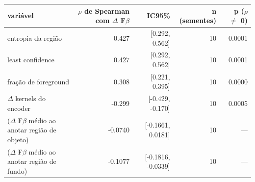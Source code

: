\begin{tabular}{lrrrr}
\toprule
variável & $\rho$ de Spearman com $\Delta$ F$\beta$ & IC95\% & n (sementes) & p ($\rho$ $\neq$ 0) \\
\midrule
entropia da região & 0.427 & [0.292, 0.562] & 10 & 0.0001 \\
least confidence & 0.427 & [0.292, 0.562] & 10 & 0.0001 \\
fração de foreground & 0.308 & [0.221, 0.395] & 10 & 0.0000 \\
$\Delta$ kernels do encoder & -0.299 & [-0.429, -0.170] & 10 & 0.0005 \\
($\Delta$ F$\beta$ médio ao anotar região de objeto) & -0.0740 & [-0.1661, 0.0181] & 10 & --- \\
($\Delta$ F$\beta$ médio ao anotar região de fundo) & -0.1077 & [-0.1816, -0.0339] & 10 & --- \\
\bottomrule
\end{tabular}

